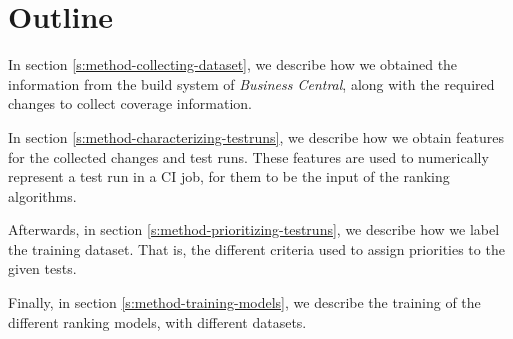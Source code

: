 \section{Outline}

In section \ref{s:method-collecting-dataset}, we describe how we obtained the information
from the build system of \emph{Business Central}, along with the required changes to collect 
coverage information.

In section \ref{s:method-characterizing-testruns}, we describe how we obtain features for
the collected changes and test runs. These features are used to numerically represent a 
test run in a CI job, for them to be the input of the ranking algorithms.

Afterwards, in section \ref{s:method-prioritizing-testruns}, we describe how we label
the training dataset. That is, the different criteria used to assign priorities to
the given tests.

Finally, in section \ref{s:method-training-models}, we describe the training of the 
different ranking models, with different datasets.